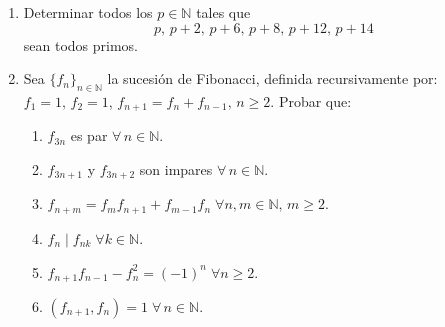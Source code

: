 \documentclass[a4paper,12pt,twoside,spanish,reqno]{amsbook}
\numberwithin{equation}{section}
\begin{document}
\begin{enumerate}
\item Determinar todos los $p\in\mathbb N$ tales que
\[ p,\, p+2,\, p+6,\, p+8,\, p+12,\, p+14 \]
sean todos primos.




\item  Sea $\{f_n\}_{n\in\mathbb N}$ la sucesi\'on de Fibonacci, definida recursivamente por: $f_1=1,\, f_2=1$, $f_{n+1}=f_{n}+f_{n-1},\, n\geq 2$. Probar que:
\begin{enumerate}
\item $f_{3n}$ es par $\forall\, n\in\mathbb N$.
\item $f_{3n+1}$ y $f_{3n+2}$ son impares $\forall\, n\in\mathbb N$.
\item $f_{n+m}=f_mf_{n+1}+f_{m-1}f_n\; \forall n,m\in\mathbb N,\, m\geq 2$.
\item $f_n\mid f_{nk}\;  \forall k\in\mathbb N$.
\item $f_{n+1}f_{n-1}-f_n^2=(-1)^n\; \forall n\geq 2$.
\item $(f_{n+1},f_n)=1\; \forall\, n\in\mathbb N$.
\end{enumerate}



\end{enumerate}
\end{document}
